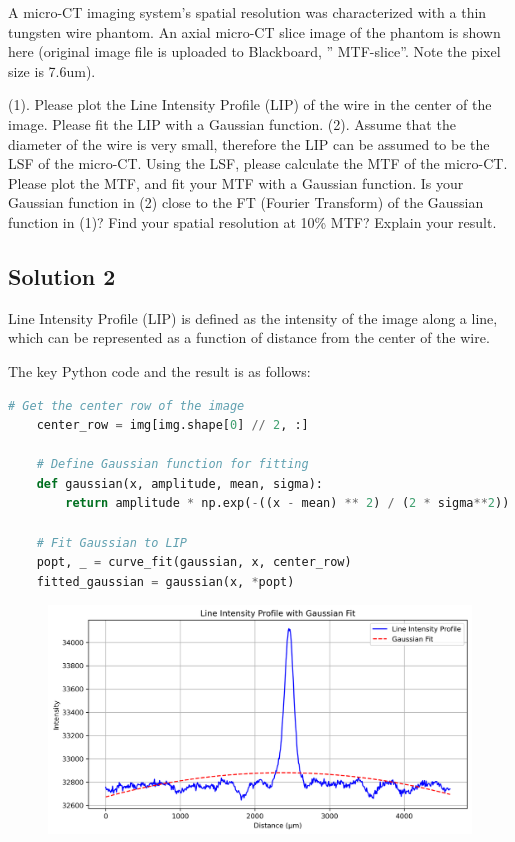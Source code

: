 \documentclass[12pt, a4paper, oneside]{ctexart}
\begin{document}
\begin{problem}

A micro-CT imaging system’s spatial resolution was characterized with a thin tungsten wire phantom. An axial micro-CT slice image of the phantom is shown here (original image file is uploaded to Blackboard, ” MTF-slice”. Note the pixel size is 7.6um).

(1). Please plot the Line Intensity Profile (LIP) of the wire in the center of the image. Please fit the LIP with a Gaussian function.
(2). Assume that the diameter of the wire is very small, therefore the LIP can be assumed to be the LSF of the micro-CT. Using the LSF, please calculate the MTF of the micro-CT.  Please plot the MTF, and fit your MTF with a Gaussian function.  Is your Gaussian function in (2) close to the FT (Fourier Transform) of the Gaussian function in (1)? Find your spatial resolution at 10\% MTF? Explain your result.


\end{problem}
\subsection*{Solution 2}


Line Intensity Profile (LIP) is defined as the intensity of the image along a line, which can be represented as a function of distance from the center of the wire.





The key Python code and the result is as follows:

\begin{lstlisting}[style=mystyle,language=Python]
	# Get the center row of the image
	center_row = img[img.shape[0] // 2, :]

	# Define Gaussian function for fitting
	def gaussian(x, amplitude, mean, sigma):
		return amplitude * np.exp(-((x - mean) ** 2) / (2 * sigma**2))

	# Fit Gaussian to LIP
	popt, _ = curve_fit(gaussian, x, center_row)
	fitted_gaussian = gaussian(x, *popt)

\end{lstlisting}


\begin{figure}[h]
	\centering
	\includegraphics[width=1\textwidth]{./result/lip_gaussian_fit.png}

\end{figure}
\end{document}
